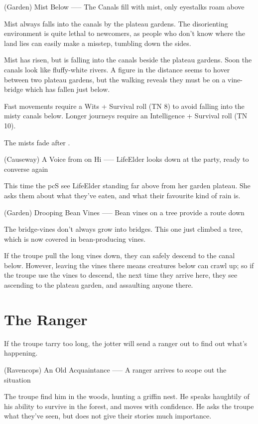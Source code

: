 (Garden) Mist Below
-----
{The Canals fill with mist, only eyestalks roam above}

Mist always falls into the canals by the plateau gardens.
The disorienting environment is quite lethal to newcomers, as people who don't know where the land lies can easily make a misstep, tumbling down the sides.

\begin{boxtext}
  Mist has risen, but is falling into the canals beside the plateau gardens.
  Soon the canals look like fluffy-white rivers.
  A figure in the distance seems to hover between two plateau gardens, but the walking reveals they must be on a vine-bridge which has fallen just below.
\end{boxtext}

Fast movements require a Wits + Survival roll (TN 8) to avoid falling into the misty canals below.
Longer journeys require an Intelligence + Survival roll (TN 10).

The mists fade after .

(Causeway) A Voice from on Hi
-----
{LifeElder looks down at the party, ready to converse again}

This time the \gls{pc}S see LifeElder standing far above from her garden plateau.
She asks them about what they've eaten, and what their favourite kind of rain is.

(Garden) Drooping Bean Vines
-----
{Bean vines on a tree provide a route down}

The bridge-vines don't always grow into bridges.
This one just climbed a tree, which is now covered in bean-producing vines.

If the troupe pull the long vines down, they can safely descend to the canal below.
However, leaving the vines there means creatures below can crawl up; so if the troupe use the vines to descend, the next time they arrive here, they see  ascending to the plateau garden, and assaulting anyone there.

\section{The Ranger}

If the troupe tarry too long, the \gls{jotter} will send a ranger out to find out what's happening.

(Ravencops) An Old Acquaintance
-----
{A ranger arrives to scope out the situation}

The troupe find him in the woods, hunting a griffin nest.
He speaks haughtily of his ability to survive in the forest, and moves with confidence.
He asks the troupe what they've seen, but does not give their stories much importance.


